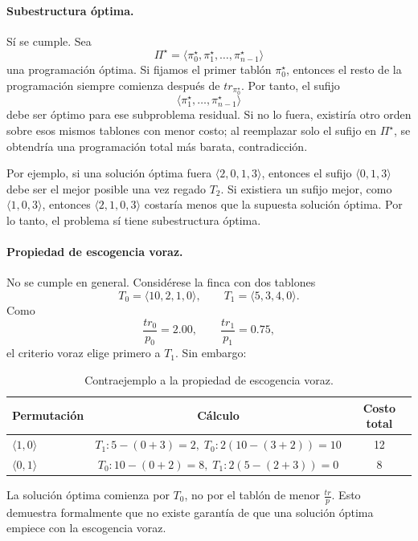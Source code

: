 \documentclass[12pt,a4paper]{article}
\begin{document}
\paragraph{Subestructura \'optima.}
S\'i se cumple. Sea
\[
\Pi^\star=\langle \pi_0^\star,\pi_1^\star,\dots,\pi_{n-1}^\star\rangle
\]
una programaci\'on \'optima. Si fijamos el primer tabl\'on \(\pi_0^\star\), entonces el resto de la programaci\'on siempre comienza despu\'es de \(tr_{\pi_0^\star}\). Por tanto, el sufijo
\[
\langle \pi_1^\star,\dots,\pi_{n-1}^\star\rangle
\]
debe ser \'optimo para ese subproblema residual. Si no lo fuera, existir\'ia otro orden sobre esos mismos tablones con menor costo; al reemplazar solo el sufijo en \(\Pi^\star\), se obtendr\'ia una programaci\'on total m\'as barata, contradicci\'on.

Por ejemplo, si una soluci\'on \'optima fuera \(\langle 2,0,1,3\rangle\), entonces el sufijo \(\langle 0,1,3\rangle\) debe ser el mejor posible una vez regado \(T_2\). Si existiera un sufijo mejor, como \(\langle 1,0,3\rangle\), entonces \(\langle 2,1,0,3\rangle\) costar\'ia menos que la supuesta soluci\'on \'optima. Por lo tanto, el problema s\'i tiene subestructura \'optima.

\paragraph{Propiedad de escogencia voraz.}
No se cumple en general. Consid\'erese la finca con dos tablones
\[
T_0=\langle 10,2,1,0\rangle,\qquad T_1=\langle 5,3,4,0\rangle.
\]
Como
\[
\frac{tr_0}{p_0}=2.00,\qquad \frac{tr_1}{p_1}=0.75,
\]
el criterio voraz elige primero a \(T_1\). Sin embargo:

\begin{table}[ht]
  \centering
  \small
  \begin{tabular}{lcc}
    \toprule
    Permutaci\'on & C\'alculo & Costo total \\
    \midrule
    \(\langle 1,0\rangle\) & \(T_1: 5-(0+3)=2,\; T_0:2(10-(3+2))=10\) & 12 \\
    \(\langle 0,1\rangle\) & \(T_0: 10-(0+2)=8,\; T_1:2(5-(2+3))=0\) & 8 \\
    \bottomrule
  \end{tabular}
  \caption{Contraejemplo a la propiedad de escogencia voraz.}
\end{table}

La soluci\'on \'optima comienza por \(T_0\), no por el tabl\'on de menor \(\frac{tr}{p}\). Esto demuestra formalmente que no existe garant\'ia de que una soluci\'on \'optima empiece con la escogencia voraz.
\end{document}
